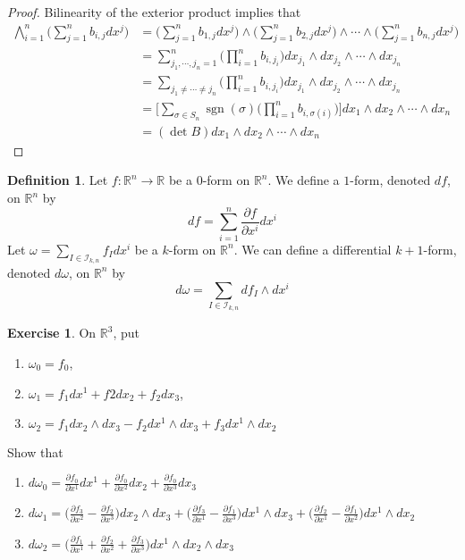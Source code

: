 \documentclass{book}
\theoremstyle{definition}
\newtheorem{defn}[definition]{Definition}
\newtheorem{ex}[definition]{Exercise}
\newcommand{\sig}{\sigma}
\newcommand{\om}{\omega}
\newcommand{\R}{\mathbb{R}}
\newcommand{\MI}{\mathcal{I}}
\DeclareMathOperator{\sgn}{sgn}
\DeclareMathOperator*{\0}{\mbf{0}}
\DeclareMathOperator*{\1}{\mbf{1}}
\newcommand{\p}{\partial}
\begin{document}
	\begin{proof}
		Bilinearity of the exterior product implies that
		\begin{align*}
			\bigwedge_{i=1}^n \bigg(\sum_{j=1}^n b_{i,j}dx^j\bigg)
			 &=\bigg(\sum_{j=1}^n b_{1,j}dx^j\bigg) \wedge \bigg(\sum_{j=1}^n b_{2,j}dx^j\bigg) \wedge \cdots \wedge \bigg(\sum_{j=1}^n b_{n,j}dx^j\bigg) \\
			 &= \sum_{j_1, \cdots, j_n = 1}^n \bigg( \prod_{i=1}^n b_{i, j_i} \bigg) dx_{j_1}\wedge  dx_{j_2} \wedge \cdots \wedge  dx_{j_n} \\
			 &= \sum_{j_1 \neq \cdots \neq j_n} \bigg( \prod_{i=1}^n b_{i, j_i} \bigg) dx_{j_1}\wedge  dx_{j_2} \wedge \cdots \wedge  dx_{j_n} \\
			 &= \bigg[ \sum_{\sig \in S_n} \sgn(\sig) \bigg(\prod_{i=1}^n b_{i, \sig(i)} \bigg) \bigg] dx_{1}\wedge  dx_{2} \wedge \cdots \wedge  dx_{n} \\
			 &= (\det B) dx_{1}\wedge  dx_{2} \wedge \cdots \wedge  dx_{n}
		\end{align*} 
		
	\end{proof}

	\begin{defn}
		Let $f: \R^n \rightarrow \R$ be a $0$-form on $\R^n$. We define a $1$-form, denoted $df$, on $\R^n$ by $$df = \sum_{i = 1}^n \frac{\p f}{\p x^i} dx^i$$
		Let $\om = \sum\limits_{I \in \MI_{k,n}} f_Idx^i$ be a $k$-form on $\R^n$. We can define a differential $k+1$-form, denoted $d \om$, on $\R^n$ by $$d\om = \sum\limits_{I \in \MI_{k,n}} df_I\wedge dx^i$$  
	\end{defn}

	\begin{ex}
		On $\R^3$, put 
		\begin{enumerate}
			\item $\om_0 = f_0$, 
			\item $\om_1 = f_1 dx^1 + f2 dx_2 + f_2 dx_3$, 
			\item $\om_2 = f_1dx_2\wedge dx_3 - f_2 dx^1 \wedge dx_3 + f_3 dx^1 \wedge dx_2$
		\end{enumerate} 
		Show that
		\begin{enumerate}
			\item $d\om_0 = \frac{\p f_0}{\p x^1}dx^1 + \frac{\p f_0}{\p x^2}dx_2 + \frac{\p f_0}{\p x^3}dx_3$
			\item $d \om_1 = \bigg(\frac{\p f_3}{\p x^2} - \frac{\p f_2}{\p x^3} \bigg) dx_2 \wedge dx_3 + \bigg( \frac{\p f_3}{\p x^1} - \frac{\p f_1}{\p x^3}\bigg)dx^1 \wedge dx_3 + \bigg( \frac{\p f_2}{\p x^1} - \frac{\p f_1}{\p x^2} \bigg) dx^1 \wedge dx_2$
			\item $d \om_2 = \bigg( \frac{\p f_1}{\p x^1} + \frac{\p f_2}{\p x^2} + \frac{\p f_3}{\p x^3} \bigg) dx^1 \wedge dx_2 \wedge dx_3$ 
		\end{enumerate}
	\end{ex}
\end{document}
